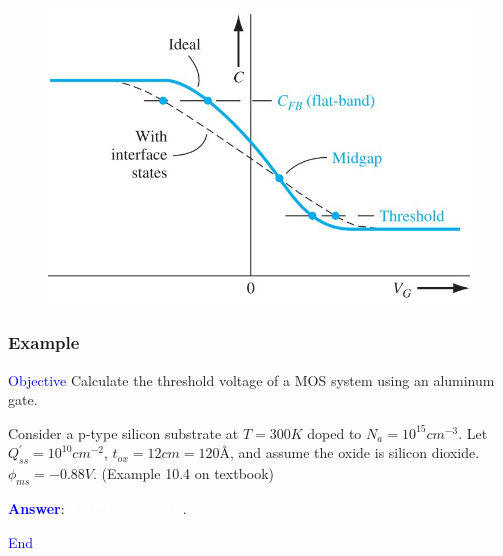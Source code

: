 \documentclass{beamer}
\begin{document}
\begin{frame}
\begin{minipage}{\linewidth}
\begin{minipage}{0.45\linewidth}
\begin{figure}[H]
                    \centering
                    \includegraphics[width=0.9\linewidth]{Surface-states.jpg}
                    \label{fig:Surface-states.jpg}
                \end{figure}
            \end{minipage}
        \end{minipage}
    \end{frame}

    \begin{frame} \frametitle{Example}
        \par \textcolor{blue}{Objective} Calculate the threshold voltage of a MOS system using an aluminum gate. 
        \par Consider a p-type silicon substrate at $T = 300K$ doped to $N_a = 10^{15} cm^{-3} $. Let $Q^\prime_{ss} = 10^{10} cm^{-2} $, $t_{ox} = 12cm = 120$\r{A}, and assume the oxide is silicon dioxide. $\phi_{ms} = -0.88 V$. (Example 10.4 on textbook)

        \vspace{1em}
        \par \textbf{\textcolor{blue}{Answer}}: \textcolor{white}{V\_{TN} = -0.262 V}.
    \end{frame}

    \begin{frame} 
        \begin{center}
            \Large\textcolor{blue}{End}
        \end{center}
    \end{frame}
\end{document}
